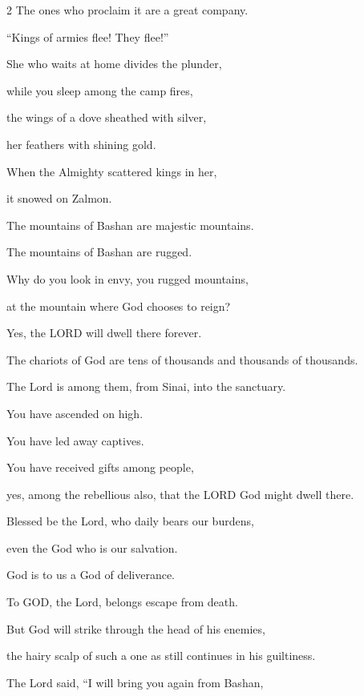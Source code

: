 \begin{multicols}{2}
	The ones who proclaim it are a great company.
	
	
	\myverse{}“Kings of armies flee! They flee!”
	
	She who waits at home divides the plunder,
	
	
	\myverse{}while you sleep among the camp fires,
	
	the wings of a dove sheathed with silver,
	
	her feathers with shining gold.
	
	
	\myverse{}When the Almighty scattered kings in her,
	
	it snowed on Zalmon.
	
	
	\myverse{}The mountains of Bashan are majestic mountains.
	
	The mountains of Bashan are rugged.
	
	
	\myverse{}Why do you look in envy, you rugged mountains,
	
	at the mountain where God chooses to reign?
	
	Yes, the LORD will dwell there forever.
	
	
	\myverse{}The chariots of God are tens of thousands and thousands of
	thousands.
	
	The Lord is among them, from Sinai, into the sanctuary.
	
	
	\myverse{}You have ascended on high.
	
	You have led away captives.
	
	You have received gifts among people,
	
	yes, among the rebellious also, that the LORD God might dwell there.
	
	\vspace{\baselineskip}
	
	\myverse{}Blessed be the Lord, who daily bears our burdens,
	
	even the God who is our salvation.
	
	\vspace{\baselineskip}	
	
	
	\myverse{}God is to us a God of deliverance.
	
	To GOD, the Lord, belongs escape from death.
	
	
	\myverse{}But God will strike through the head of his enemies,
	
	the hairy scalp of such a one as still continues in his guiltiness.
	
	
	\myverse{}The Lord said, “I will bring you again from Bashan,
	

\end{multicols}
